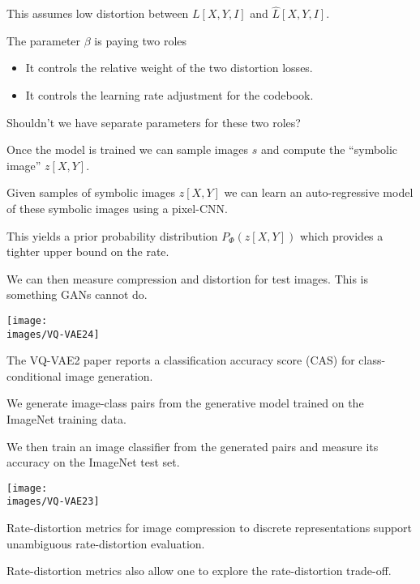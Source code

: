{\vfill
This assumes low distortion between $L[X,Y,I]$ and $\hat{L}[X,Y,I]$.


The parameter $\beta$ is paying two roles

\vfill
\begin{itemize}
\item It controls the relative weight of the two distortion losses.

\vfill
\item It controls the learning rate adjustment for the codebook.
\end{itemize}

\vfill
Shouldn't we have separate parameters for these two roles?


Once the model is trained we can sample images $s$ and compute the ``symbolic image'' $z[X,Y]$.

\vfill
Given samples of symbolic images $z[X,Y]$ we can learn an auto-regressive model of these symbolic images using a pixel-CNN.

\vfill
This yields a prior probability distribution $P_\Phi(z[X,Y])$ which provides a tighter upper bound on the rate.

\vfill
We can then measure compression and distortion for test images.  This is something GANs cannot do.

\centerline{\texttt{[image: \\images/VQ-VAE24]}}


The VQ-VAE2 paper reports a classification accuracy score (CAS) for class-conditional image generation.

\vfill
We generate image-class pairs from the generative model trained on the ImageNet training data.

\vfill
We then train an image classifier from the generated pairs and measure its accuracy on the ImageNet test set.

\vfill
\centerline{\texttt{[image: \\images/VQ-VAE23]}}


Rate-distortion metrics for image compression to discrete representations support unambiguous rate-distortion evaluation.

\vfill
Rate-distortion metrics also allow one to explore the rate-distortion trade-off.

}

